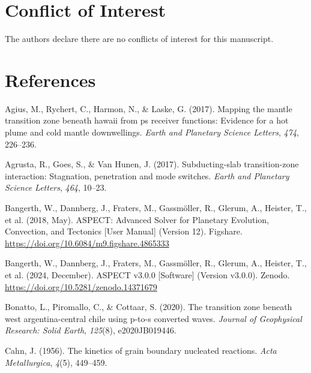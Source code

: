 \documentclass[draft,linenumbers]{agujournal2019}
\newlength{\cslhangindent}
\newenvironment{CSLReferences}[2]
 {\begin{list}{}{
  \setlength{\itemindent}{0pt}
  \setlength{\leftmargin}{0pt}
  \setlength{\parsep}{0pt}
  \ifodd #1
   \setlength{\leftmargin}{\cslhangindent}
   \setlength{\itemindent}{-\cslhangindent}
  \fi
  \setlength{\itemsep}{#2\baselineskip}
  }
  \item\relax}
 {\end{list}}
\begin{document}
\section*{Conflict of Interest}\label{sec:conflict-of-interest}

The authors declare there are no conflicts of interest for this
manuscript.

\clearpage

\section*{References}\label{sec:references}

\protect{}\label{refs}
\begin{CSLReferences}{1}{0}
Agius, M., Rychert, C., Harmon, N., \& Laske, G. (2017). Mapping the
mantle transition zone beneath hawaii from ps receiver functions:
Evidence for a hot plume and cold mantle downwellings. \emph{Earth and
Planetary Science Letters}, \emph{474}, 226--236.

Agrusta, R., Goes, S., \& Van Hunen, J. (2017). Subducting-slab
transition-zone interaction: Stagnation, penetration and mode switches.
\emph{Earth and Planetary Science Letters}, \emph{464}, 10--23.

Bangerth, W., Dannberg, J., Fraters, M., Gassmöller, R., Glerum, A.,
Heister, T., et al. (2018, May). {ASPECT: Advanced Solver for Planetary
Evolution, Convection, and Tectonics {[}User Manual{]}} (Version 12).
Figshare. \url{https://doi.org/10.6084/m9.figshare.4865333}

Bangerth, W., Dannberg, J., Fraters, M., Gassmöller, R., Glerum, A.,
Heister, T., et al. (2024, December). {ASPECT v3.0.0 {[}Software{]}}
(Version v3.0.0). Zenodo. \url{https://doi.org/10.5281/zenodo.14371679}

Bonatto, L., Piromallo, C., \& Cottaar, S. (2020). The transition zone
beneath west argentina-central chile using p-to-s converted waves.
\emph{Journal of Geophysical Research: Solid Earth}, \emph{125}(8),
e2020JB019446.

Cahn, J. (1956). The kinetics of grain boundary nucleated reactions.
\emph{Acta Metallurgica}, \emph{4}(5), 449--459.


\end{CSLReferences}
\end{document}
